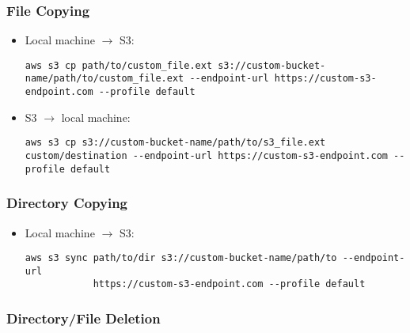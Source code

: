 \documentclass[12pt, a4paper]{article}
\numberwithin{equation}{section}
\theoremstyle{definition}
\theoremstyle{definition}
\begin{document}
	\subsubsection{File Copying}
	
	\begin{itemize}
		\item Local machine $\longrightarrow$ S3:
		
		\begin{lstlisting}[style=mystylebash, label=alg:aws__file_copying_local_s3, xleftmargin=\parindent]
			aws s3 cp path/to/custom_file.ext s3://custom-bucket-name/path/to/custom_file.ext --endpoint-url https://custom-s3-endpoint.com --profile default
		\end{lstlisting}	
		
		\item S3 $\longrightarrow$ local machine:
		
		\begin{lstlisting}[style=mystylebash, label=alg:aws__file_copying_s3_local, xleftmargin=\parindent]
			aws s3 cp s3://custom-bucket-name/path/to/s3_file.ext custom/destination --endpoint-url https://custom-s3-endpoint.com --profile default
		\end{lstlisting}	
	\end{itemize}

	\subsubsection{Directory Copying}
	
	\begin{itemize}
		\item Local machine $\longrightarrow$ S3:
		
		\begin{lstlisting}[style=mystylebash, label=alg:aws__dir_copying, xleftmargin=\parindent]
			aws s3 sync path/to/dir s3://custom-bucket-name/path/to --endpoint-url      
			https://custom-s3-endpoint.com --profile default
		\end{lstlisting}
		
	\end{itemize}

	\subsubsection{Directory/File Deletion}
	
\end{document}
